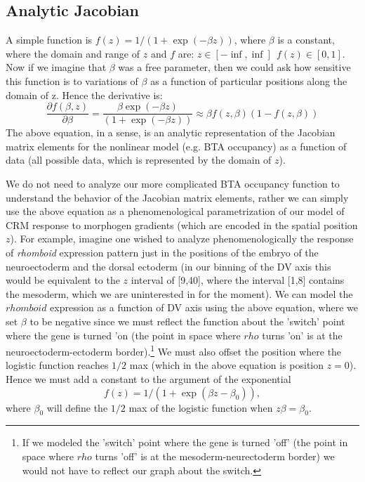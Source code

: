 \subsection{Analytic Jacobian }
A simple function is $f(z)=1/(1+\exp(-\beta z))$, where $\beta$ is a constant, where the domain and range of $z$ and $f$ are: $z \in [-\inf,\inf] \ \ f(z) \in [0,1]$.  Now if we imagine that $\beta$ was a free parameter, then we could ask how sensitive this function is to variations of $\beta$ as a function of particular positions along the domain of z.  Hence the derivative is:
\begin{equation}
 \frac{\partial{f(\beta,z)}}{\partial{\beta}}= \frac{\beta \exp{(-\beta z)}}{(1 + \exp{(-\beta z)})} \approx  \beta f(z,\beta) (1-f(z,\beta))
 \end{equation}
 The above equation, in a sense, is an analytic representation of the Jacobian matrix elements for the nonlinear model (e.g. BTA occupancy) as a function of data (all possible data, which is represented by the domain of $z$).  
 
 We do not need to analyze our more complicated BTA occupancy function to understand the behavior of the Jacobian matrix elements, rather we can simply use the above equation as a phenomenological parametrization of our model of CRM response to morphogen gradients (which are encoded in the spatial position $z$).  For example, imagine one wished to analyze phenomenologically the response of \textit{rhomboid} expression pattern just in the positions of the embryo of the neuroectoderm and the dorsal ectoderm (in our binning of the DV axis this would be equivalent to the $z$ interval of [9,40], where the interval [1,8] contains the mesoderm, which we are uninterested in for the moment).  We can model the $rhomboid$ expression as a function of DV axis using the above equation, where we set $\beta$ to be negative since we must reflect the function about the 'switch' point where the gene is turned 'on (the point in space where $rho$ turns 'on' is at the neuroectoderm-ectoderm border).\footnote{If we modeled the 'switch' point where the gene is turned 'off' (the point in space where $rho$ turns 'off' is at the mesoderm-neurectoderm border) we would not have to reflect our graph about the switch.}  We must also offset the position where the logistic function reaches $1/2$ max (which in the above equation is position $z=0$).  Hence we must add a constant to the argument of the exponential $$f(z)=1/(1+\exp(\beta z -\beta_0 )),$$ where $\beta_0 $ will define the $1/2$ max of the logistic function when $z\beta=\beta_0$.
 
